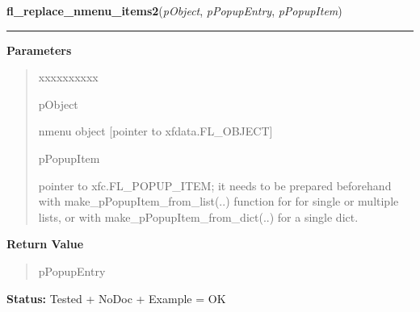 \hspace{.8\funcindent}\begin{boxedminipage}{\funcwidth}

    \raggedright \textbf{fl\_replace\_nmenu\_items2}(\textit{pObject}, \textit{pPopupEntry}, \textit{pPopupItem})

    \vspace{-1.5ex}

    \rule{\textwidth}{0.5\fboxrule}
\setlength{\parskip}{2ex}
\setlength{\parskip}{1ex}
      \textbf{Parameters}
      \vspace{-1ex}

      \begin{quote}
        \begin{Ventry}{xxxxxxxxxx}

          \item[pObject]

          nmenu object [pointer to xfdata.FL\_OBJECT]

          \item[pPopupItem]

          pointer to xfc.FL\_POPUP\_ITEM; it needs to be prepared 
          beforehand with make\_pPopupItem\_from\_list(..) function for for
          single or multiple lists, or with 
          make\_pPopupItem\_from\_dict(..) for a single dict.

        \end{Ventry}

      \end{quote}

      \textbf{Return Value}
    \vspace{-1ex}

      \begin{quote}
      pPopupEntry

      \end{quote}

\textbf{Status:} Tested + NoDoc + Example = OK



    \end{boxedminipage}

    \label{xformslib:library:fl_get_nmenu_popup}

    \vspace{0.5ex}

